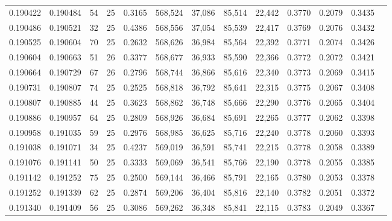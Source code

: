 \begin{tabular}{rrrrrrrrrrrrr}
0.190422 & 0.190484 &  54 &  25 &                                     0.3165 & 568,524 &  37,086 &  85,514 &  22,442 & 0.3770 & 0.2079 & 0.3435 \\
0.190486 & 0.190521 &  32 &  25 &                                     0.4386 & 568,556 &  37,054 &  85,539 &  22,417 & 0.3769 & 0.2076 & 0.3432 \\
0.190525 & 0.190604 &  70 &  25 &                                     0.2632 & 568,626 &  36,984 &  85,564 &  22,392 & 0.3771 & 0.2074 & 0.3426 \\
0.190604 & 0.190663 &  51 &  26 &                                     0.3377 & 568,677 &  36,933 &  85,590 &  22,366 & 0.3772 & 0.2072 & 0.3421 \\
0.190664 & 0.190729 &  67 &  26 &                                     0.2796 & 568,744 &  36,866 &  85,616 &  22,340 & 0.3773 & 0.2069 & 0.3415 \\
0.190731 & 0.190807 &  74 &  25 &                                     0.2525 & 568,818 &  36,792 &  85,641 &  22,315 & 0.3775 & 0.2067 & 0.3408 \\
0.190807 & 0.190885 &  44 &  25 &                                     0.3623 & 568,862 &  36,748 &  85,666 &  22,290 & 0.3776 & 0.2065 & 0.3404 \\
0.190886 & 0.190957 &  64 &  25 &                                     0.2809 & 568,926 &  36,684 &  85,691 &  22,265 & 0.3777 & 0.2062 & 0.3398 \\
0.190958 & 0.191035 &  59 &  25 &                                     0.2976 & 568,985 &  36,625 &  85,716 &  22,240 & 0.3778 & 0.2060 & 0.3393 \\
0.191038 & 0.191071 &  34 &  25 &                                     0.4237 & 569,019 &  36,591 &  85,741 &  22,215 & 0.3778 & 0.2058 & 0.3389 \\
0.191076 & 0.191141 &  50 &  25 &                                     0.3333 & 569,069 &  36,541 &  85,766 &  22,190 & 0.3778 & 0.2055 & 0.3385 \\
0.191142 & 0.191252 &  75 &  25 &                                     0.2500 & 569,144 &  36,466 &  85,791 &  22,165 & 0.3780 & 0.2053 & 0.3378 \\
0.191252 & 0.191339 &  62 &  25 &                                     0.2874 & 569,206 &  36,404 &  85,816 &  22,140 & 0.3782 & 0.2051 & 0.3372 \\
0.191340 & 0.191409 &  56 &  25 &                                     0.3086 & 569,262 &  36,348 &  85,841 &  22,115 & 0.3783 & 0.2049 & 0.3367 \\

\end{tabular}
